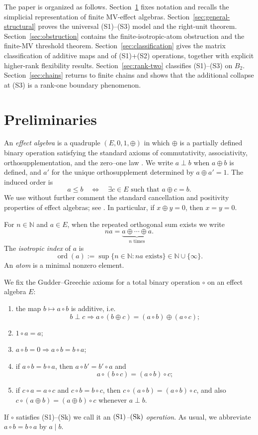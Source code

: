 \documentclass[11pt]{article}
\theoremstyle{definition}
\theoremstyle{remark}
\numberwithin{equation}{section}
\newcommand{\op}{\oplus}
\newcommand{\perpdef}{\mathrel{\perp}}
\newcommand{\NN}{\mathbb{N}}
\newcommand{\ord}{\operatorname{ord}}
\begin{document}
The paper is organized as follows. Section~\ref{sec:preliminaries} fixes notation and recalls the simplicial representation of finite MV-effect algebras. Section~\ref{sec:general-structural} proves the universal \textup{(S1)}--\textup{(S3)} model and the right-unit theorem. Section~\ref{sec:obstruction} contains the finite-isotropic-atom obstruction and the finite-MV threshold theorem. Section~\ref{sec:classification} gives the matrix classification of additive maps and of \textup{(S1)}+\textup{(S2)} operations, together with explicit higher-rank flexibility results. Section~\ref{sec:rank-two} classifies \textup{(S1)}--\textup{(S3)} on $B_2$. Section~\ref{sec:chains} returns to finite chains and shows that the additional collapse at \textup{(S3)} is a rank-one boundary phenomenon.

\section{Preliminaries}\label{sec:preliminaries}
An \emph{effect algebra} is a quadruple $(E,0,1,\op)$ in which $\op$ is a partially defined binary operation satisfying the standard axioms of commutativity, associativity, orthosupplementation, and the zero--one law \cite{FoulisBennett1994}. We write $a\perpdef b$ when $a\op b$ is defined, and $a'$ for the unique orthosupplement determined by $a\op a'=1$. The induced order is
\[
a\le b \quad\Longleftrightarrow\quad \exists c\in E\text{ such that }a\op c=b.
\]
We use without further comment the standard cancellation and positivity properties of effect algebras; see \cite[Definition~1.1 and the discussion after it]{Tkadlec2008}. In particular, if $x\op y=0$, then $x=y=0$.

For $n\in\NN$ and $a\in E$, when the repeated orthogonal sum exists we write
\[
na=\underbrace{a\op\cdots\op a}_{n\text{ times}}.
\]
The \emph{isotropic index} of $a$ is
\[
\ord(a):=\sup\{n\in\NN: na\text{ exists}\}\in\NN\cup\{\infty\}.
\]
An \emph{atom} is a minimal nonzero element.

We fix the Gudder--Greechie axioms for a total binary operation $\circ$ on an effect algebra $E$:
\begin{enumerate}[label=\textup{(S\arabic*)},leftmargin=3.2em]
    \item the map $b\mapsto a\circ b$ is additive, i.e.
    \[
    b\perpdef c \Longrightarrow a\circ (b\op c)=(a\circ b)\op(a\circ c);
    \]
    \item $1\circ a=a$;
    \item $a\circ b=0 \Longrightarrow a\circ b=b\circ a$;
    \item if $a\circ b=b\circ a$, then $a\circ b'=b'\circ a$ and
    \[
    a\circ (b\circ c)=(a\circ b)\circ c;
    \]
    \item if $c\circ a=a\circ c$ and $c\circ b=b\circ c$, then $c\circ(a\circ b)=(a\circ b)\circ c$, and also $c\circ(a\op b)=(a\op b)\circ c$ whenever $a\perpdef b$.
\end{enumerate}
If $\circ$ satisfies \textup{(S1)}--\textup{(Sk)} we call it an \emph{$\textup{(S1)}$--$\textup{(Sk)}$ operation}. As usual, we abbreviate $a\circ b=b\circ a$ by $a\mid b$.
\end{document}
